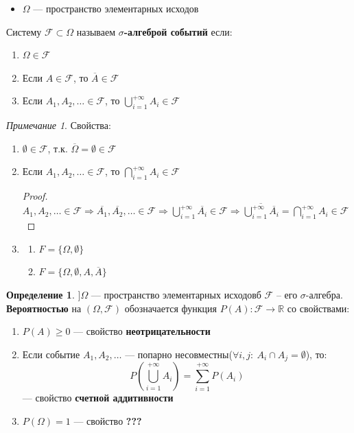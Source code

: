 \documentclass[oneside]{book}
\newcommand{\R}{\mathbb{R}}
\theoremstyle{plain}
\theoremstyle{remark}
\newtheorem*{remark}{Примечание}
\theoremstyle{definition}
\newtheorem*{definition}{Определение}
\begin{document}
\begin{itemize}
\item \(\Omega\) --- пространство элементарных исходов
\end{itemize}
\begin{deifinition}
Систему \(\mathcal{F} \subset \Omega\) называем \textbf{\(\sigma\)-алгеброй событий} если:
\begin{enumerate}
\item \(\Omega \in \mathcal{F}\)
\item Если \(A \in \mathcal{F}\), то \(\overline{A} \in \mathcal{F}\)
\item Если \(A_1, A_2, \dots \in \mathcal{F}\), то \(\bigcup_{i=1}^{+ \infty} A_i \in \mathcal{F}\)
\end{enumerate}
\end{deifinition}
\begin{remark}
Свойства:
\begin{enumerate}
\item \(\emptyset \in \mathcal{F}\), т.к. \(\overline{\Omega} = \emptyset \in \mathcal{F}\)
\item Если \(A_1, A_2, \dots \in \mathcal{F}\), то \(\bigcap_{i = 1}^{+ \infty} A_i \in \mathcal{F}\)
\begin{proof}
\-\\
\(A_1, A_2, \dots \in \mathcal{F} \Rightarrow \overline{A_1}, \overline{A_2}, \dots \in \mathcal{F} \Rightarrow \bigcup_{i = 1}^{+ \infty} \overline{A_i} \in \mathcal{F} \Rightarrow \overline{\bigcup_{i = 1}^{+ \infty}\overline{A_i}} = \bigcap_{i = 1}^{+ \infty} A_i \in \mathcal{F}\)
\end{proof}
\item \begin{enumerate}
\item \(F = \{\Omega, \emptyset\}\)
\item \(F = \{\Omega, \emptyset, A, \overline{A}\}\)
\end{enumerate}
\end{enumerate}
\end{remark}
\begin{definition}
\(] \Omega\) --- пространство элементарных исходовб \(\mathcal{F}\) -- его \(\sigma\)-алгебра.
\textbf{Вероятностью} на \((\Omega, \mathcal{F})\) обозначается функция \(P(A): \mathcal{F} \to \R\) со свойствами:
\begin{enumerate}
\item \(P(A) \ge 0\) --- свойство \textbf{неотрицательности}
\item Если событие \(A_1, A_2, \dots\) --- попарно несовместны(\(\forall i,j:\ A_i \cap A_j = \emptyset\)),
то: \[ P(\bigcup_{i = 1}^{+ \infty} A_i) = \sum_{i = 1}^{+ \infty} P(A_i) \] --- свойство \textbf{счетной аддитивности}
\item \(P(\Omega) = 1\) --- свойство \textbf{\color{red}???}
\end{enumerate}
\end{definition}
\end{document}
